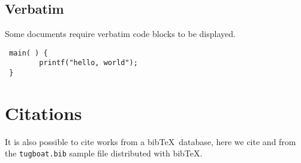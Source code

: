 \documentclass[a4paper,twocolumn]{article}
\begin{document}
\subsection{Verbatim}
Some documents require verbatim code blocks to be displayed.
\begin{verbatim}
 main( ) {
        printf("hello, world");
 }
\end{verbatim}

\section{Citations}
It is also possible to cite works from a bib\TeX\ database, here we
cite \cite{Knuth:TB5-1-67} and \cite{Hoekwater:TB28-3-312} from the
\texttt{tugboat.bib} sample file distributed with bib\TeX.


\raggedright

\end{document}
